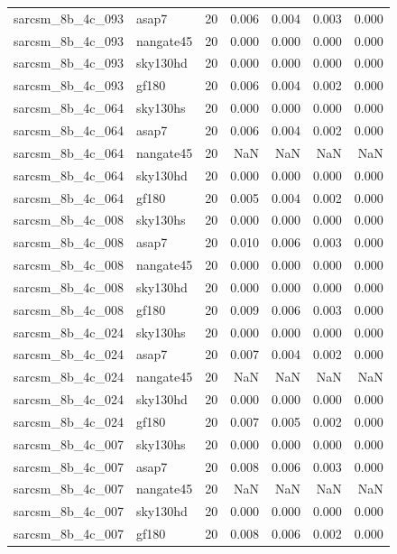 \begin{tabular}{llrrrrr}
sarcsm\_8b\_4c\_093 & asap7 & 20 & 0.006 & 0.004 & 0.003 & 0.000 \\
sarcsm\_8b\_4c\_093 & nangate45 & 20 & 0.000 & 0.000 & 0.000 & 0.000 \\
sarcsm\_8b\_4c\_093 & sky130hd & 20 & 0.000 & 0.000 & 0.000 & 0.000 \\
sarcsm\_8b\_4c\_093 & gf180 & 20 & 0.006 & 0.004 & 0.002 & 0.000 \\
sarcsm\_8b\_4c\_064 & sky130hs & 20 & 0.000 & 0.000 & 0.000 & 0.000 \\
sarcsm\_8b\_4c\_064 & asap7 & 20 & 0.006 & 0.004 & 0.002 & 0.000 \\
sarcsm\_8b\_4c\_064 & nangate45 & 20 & NaN & NaN & NaN & NaN \\
sarcsm\_8b\_4c\_064 & sky130hd & 20 & 0.000 & 0.000 & 0.000 & 0.000 \\
sarcsm\_8b\_4c\_064 & gf180 & 20 & 0.005 & 0.004 & 0.002 & 0.000 \\
sarcsm\_8b\_4c\_008 & sky130hs & 20 & 0.000 & 0.000 & 0.000 & 0.000 \\
sarcsm\_8b\_4c\_008 & asap7 & 20 & 0.010 & 0.006 & 0.003 & 0.000 \\
sarcsm\_8b\_4c\_008 & nangate45 & 20 & 0.000 & 0.000 & 0.000 & 0.000 \\
sarcsm\_8b\_4c\_008 & sky130hd & 20 & 0.000 & 0.000 & 0.000 & 0.000 \\
sarcsm\_8b\_4c\_008 & gf180 & 20 & 0.009 & 0.006 & 0.003 & 0.000 \\
sarcsm\_8b\_4c\_024 & sky130hs & 20 & 0.000 & 0.000 & 0.000 & 0.000 \\
sarcsm\_8b\_4c\_024 & asap7 & 20 & 0.007 & 0.004 & 0.002 & 0.000 \\
sarcsm\_8b\_4c\_024 & nangate45 & 20 & NaN & NaN & NaN & NaN \\
sarcsm\_8b\_4c\_024 & sky130hd & 20 & 0.000 & 0.000 & 0.000 & 0.000 \\
sarcsm\_8b\_4c\_024 & gf180 & 20 & 0.007 & 0.005 & 0.002 & 0.000 \\
sarcsm\_8b\_4c\_007 & sky130hs & 20 & 0.000 & 0.000 & 0.000 & 0.000 \\
sarcsm\_8b\_4c\_007 & asap7 & 20 & 0.008 & 0.006 & 0.003 & 0.000 \\
sarcsm\_8b\_4c\_007 & nangate45 & 20 & NaN & NaN & NaN & NaN \\
sarcsm\_8b\_4c\_007 & sky130hd & 20 & 0.000 & 0.000 & 0.000 & 0.000 \\
sarcsm\_8b\_4c\_007 & gf180 & 20 & 0.008 & 0.006 & 0.002 & 0.000 \\

\end{tabular}
